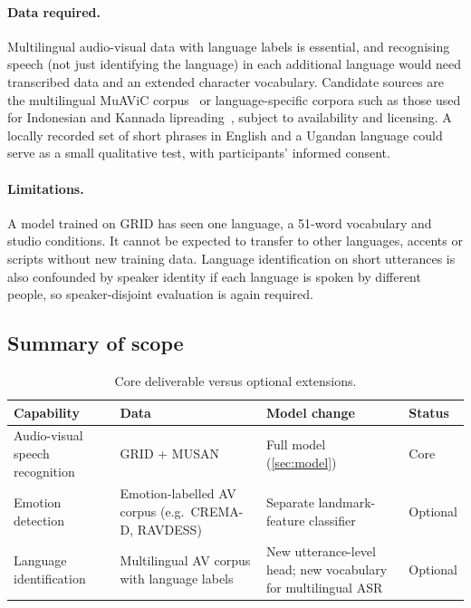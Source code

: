 \paragraph{Data required.} Multilingual audio-visual data with language labels is
essential, and recognising speech (not just identifying the language) in each
additional language would need transcribed data and an extended character
vocabulary. Candidate sources are the multilingual MuAViC corpus~\cite{anwar2023}
or language-specific corpora such as those used for Indonesian and Kannada
lipreading~\cite{aripin2024,kanavnet2026}, subject to availability and licensing.
A locally recorded set of short phrases in English and a Ugandan language could
serve as a small qualitative test, with participants' informed consent.

\paragraph{Limitations.} A model trained on GRID has seen one language, a 51-word
vocabulary and studio conditions. It cannot be expected to transfer to other
languages, accents or scripts without new training data. Language identification
on short utterances is also confounded by speaker identity if each language is
spoken by different people, so speaker-disjoint evaluation is again required.

\subsection{Summary of scope}
\begin{table}[H]
\centering
\caption{Core deliverable versus optional extensions.}
\label{tab:scope}
\small
\begin{tabularx}{\textwidth}{@{}p{3.2cm}XXp{2.2cm}@{}}
\toprule
\textbf{Capability} & \textbf{Data} & \textbf{Model change} & \textbf{Status} \\
\midrule
Audio-visual speech recognition & GRID + MUSAN & Full model (\cref{sec:model}) & Core \\
Emotion detection & Emotion-labelled AV corpus (e.g.\ CREMA-D, RAVDESS) & Separate landmark-feature classifier & Optional \\
Language identification & Multilingual AV corpus with language labels & New utterance-level head; new vocabulary for multilingual ASR & Optional \\
\bottomrule
\end{tabularx}
\end{table}
